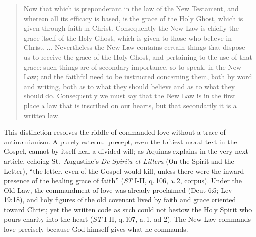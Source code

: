 \begin{quote}
Now that which is preponderant in the law of the New Testament, and whereon all its efficacy is based, is the grace of the Holy Ghost, which is given through faith in Christ. Consequently the New Law is chiefly the grace itself of the Holy Ghost, which is given to those who believe in Christ. ... Nevertheless the New Law contains certain things that dispose us to receive the grace of the Holy Ghost, and pertaining to the use of that grace: such things are of secondary importance, so to speak, in the New Law; and the faithful need to be instructed concerning them, both by word and writing, both as to what they should believe and as to what they should do. Consequently we must say that the New Law is in the first place a law that is inscribed on our hearts, but that secondarily it is a written law.
\end{quote}

This distinction resolves the riddle of commanded love without a trace of antinomianism. A purely external precept, even the loftiest moral text in the Gospel, cannot by itself heal a divided will; as Aquinas explains in the very next article, echoing St.\ Augustine's \emph{De Spiritu et Littera} (On the Spirit and the Letter), ``the letter, even of the Gospel would kill, unless there were the inward presence of the healing grace of faith'' (\emph{ST} I-II, q.\,106, a.\,2, corpus). Under the Old Law, the commandment of love was already proclaimed (Deut 6:5; Lev 19:18), and holy figures of the old covenant lived by faith and grace oriented toward Christ; yet the written code as such could not bestow the Holy Spirit who pours charity into the heart (\emph{ST} I-II, q.\,107, a.\,1, ad 2). The New Law commands love precisely because God himself gives what he commands.


